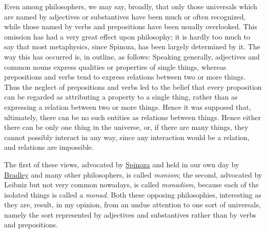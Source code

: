 \documentclass[oneside,letterpaper,12pt]{book}
\begin{document}
Even among philosophers, we may say, broadly, that only those universals
which are named by adjectives or substantives have been much or often
recognized, while those named by verbs and prepositions have been
usually overlooked. This omission has had a very great effect upon
philosophy; it is hardly too much to say that most metaphysics, since
Spinoza, has been largely determined by it. The way this has occurred
is, in outline, as follows: Speaking generally, adjectives and common
nouns express qualities or properties of single things, whereas
prepositions and verbs tend to express relations between two or more
things. Thus the neglect of prepositions and verbs led to the belief
that every proposition can be regarded as attributing a property to a
single thing, rather than as expressing a relation between two or more
things. Hence it was supposed that, ultimately, there can be no such
entities as relations between things. Hence either there can be only one
thing in the universe, or, if there are many things, they cannot
possibly interact in any way, since any interaction would be a relation,
and relations are impossible.

The first of these views, advocated by \href{https://plato.stanford.edu/entries/spinoza/}{Spinoza} 
and held in our own day by \href{https://plato.stanford.edu/entries/bradley/}{Bradley} 
and many other philosophers, is called \emph{monism}; the
second, advocated by Leibniz but not very common nowadays, is called
\emph{monadism}, because each of the isolated things is called a
\emph{monad}. Both these opposing philosophies, interesting as they are,
result, in my opinion, from an undue attention to one sort of
universals, namely the sort represented by adjectives and substantives
rather than by verbs and prepositions.
\end{document}
